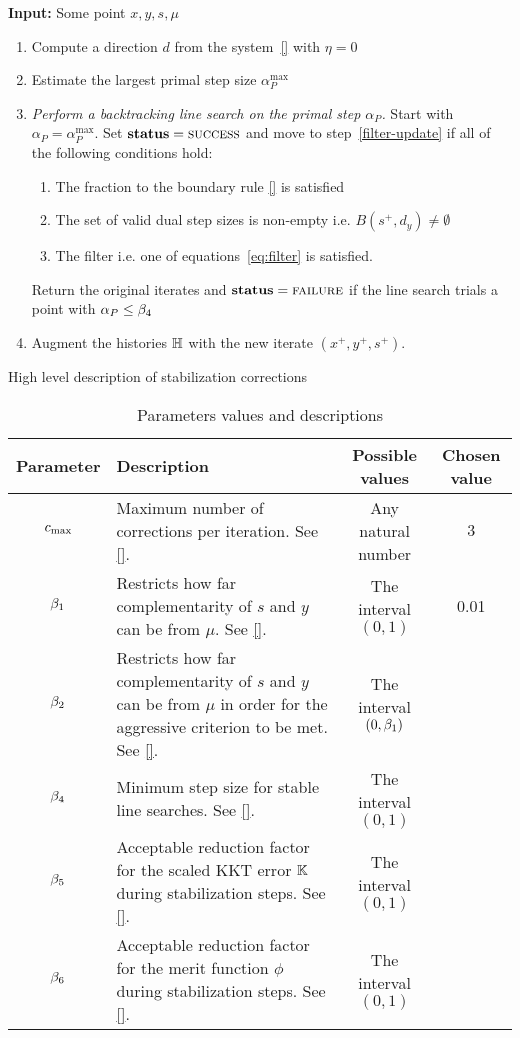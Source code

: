 \documentclass{article}
\begin{document}
\begin{algorithm}[H]
\textbf{Input:} Some point $x, y, s, \mu$
\begin{enumerate}[label*=A.{\arabic*}]
\item Compute a direction $d$ from the system~\eqref{} with $\eta = 0$
\item Estimate the largest primal step size $\alpha^{\max}_{P}$
\item \emph{Perform a backtracking line search on the primal step $\alpha_{P}$.} Start with $\alpha_{P} = \alpha^{\max}_{P}$. Set $\textbf{status} = \textsc{success}$ and move to step~\eqref{filter-update} if all of the following conditions hold:
\begin{enumerate}[label=({\roman*})] 
\item The fraction to the boundary rule \eqref{} is satisfied 
\item The set of valid dual step sizes is non-empty i.e. $B( s^{+}, d_{y} ) \neq \emptyset$ 
\item The filter i.e. one of equations~\eqref{eq:filter} is satisfied.
\end{enumerate}
Return the original iterates and $\textbf{status} = \textsc{failure}$ if the line search trials a point with $\alpha_{P} \le \beta_{4}$
\item \label{filter-update} Augment the histories $\mathbb{H}$ with the new iterate $(x^{+}, y^{+}, s^{+})$.
\end{enumerate}
\caption{High level description of stabilization corrections}\label{alg:stable}
\end{algorithm}

\begin{table}[H]
\begin{tabular}{ |c| p{7cm}|c|c| } 
 \hline
Parameter & Description & Possible values & Chosen value  \\ 
 \hline
$c_{\max}$ & Maximum number of corrections per iteration. See \eqref{}.  & Any natural number & $3$  \\ 
 \hline
  $\beta_{1}$ & Restricts how far complementarity of $s$ and $y$ can be from $\mu$. See \eqref{}.  & The interval $(0,1)$ & 0.01 \\ 
 \hline
   $\beta_{2}$ & Restricts how far complementarity of $s$ and $y$ can be from $\mu$ in order for the aggressive criterion to be met. See \eqref{}.  & The interval  $(0, \beta_{1})$ &  \\ 
    \hline
   $\beta_{4}$ & Minimum step size for stable line searches. See \eqref{}.  & The interval $(0,1)$ &  \\ 
   \hline
      $\beta_{5}$ & Acceptable reduction factor for the scaled KKT error $\mathbb{K}$ during stabilization steps. See \eqref{}.  & The interval $(0,1)$ &  \\ 
      \hline
            $\beta_{6}$ & Acceptable reduction factor for the merit function $\phi$ during stabilization steps. See \eqref{}.  & The interval $(0,1)$ &  \\
\hline
\end{tabular}
\caption{Parameters values and descriptions}
\end{table}
\end{document}
